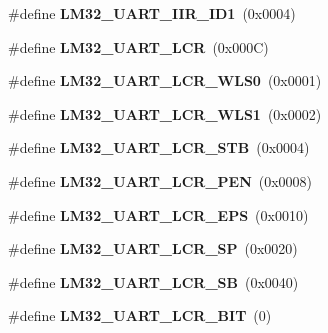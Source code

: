 \begin{DoxyCompactItemize}
\item 
\mbox{\label{group__lm32__uart_ga20b6c39a7f73be55d564e6062ac14267}} 
\#define {\bfseries L\+M32\+\_\+\+U\+A\+R\+T\+\_\+\+I\+I\+R\+\_\+\+I\+D1}~(0x0004)
\item 
\mbox{\label{group__lm32__uart_ga88737d463921f06cc45d653fc4c45bde}} 
\#define {\bfseries L\+M32\+\_\+\+U\+A\+R\+T\+\_\+\+L\+CR}~(0x000\+C)
\item 
\mbox{\label{group__lm32__uart_gac67dbafade86ca732c84dfcb9bfdc7e2}} 
\#define {\bfseries L\+M32\+\_\+\+U\+A\+R\+T\+\_\+\+L\+C\+R\+\_\+\+W\+L\+S0}~(0x0001)
\item 
\mbox{\label{group__lm32__uart_ga92067208831a506d3bfcb74f86815e9a}} 
\#define {\bfseries L\+M32\+\_\+\+U\+A\+R\+T\+\_\+\+L\+C\+R\+\_\+\+W\+L\+S1}~(0x0002)
\item 
\mbox{\label{group__lm32__uart_ga0111fb6d910e137b33c2d5122eeff62a}} 
\#define {\bfseries L\+M32\+\_\+\+U\+A\+R\+T\+\_\+\+L\+C\+R\+\_\+\+S\+TB}~(0x0004)
\item 
\mbox{\label{group__lm32__uart_ga80d5f55277810044ef84432a050b3185}} 
\#define {\bfseries L\+M32\+\_\+\+U\+A\+R\+T\+\_\+\+L\+C\+R\+\_\+\+P\+EN}~(0x0008)
\item 
\mbox{\label{group__lm32__uart_ga8bb48699f65d18fcaa9850a62ac0b753}} 
\#define {\bfseries L\+M32\+\_\+\+U\+A\+R\+T\+\_\+\+L\+C\+R\+\_\+\+E\+PS}~(0x0010)
\item 
\mbox{\label{group__lm32__uart_gadafda61fb2420089afbf56e843d3987b}} 
\#define {\bfseries L\+M32\+\_\+\+U\+A\+R\+T\+\_\+\+L\+C\+R\+\_\+\+SP}~(0x0020)
\item 
\mbox{\label{group__lm32__uart_ga4aefd15f24861d33c9b3fb9b1e9727c3}} 
\#define {\bfseries L\+M32\+\_\+\+U\+A\+R\+T\+\_\+\+L\+C\+R\+\_\+\+SB}~(0x0040)
\item 
\mbox{\label{group__lm32__uart_ga5e861cfde0fe4a0342d9d21d1574a3ef}} 
\#define {\bfseries L\+M32\+\_\+\+U\+A\+R\+T\+\_\+\+L\+C\+R\+\_\+B\+IT}~(0)

\end{DoxyCompactItemize}
